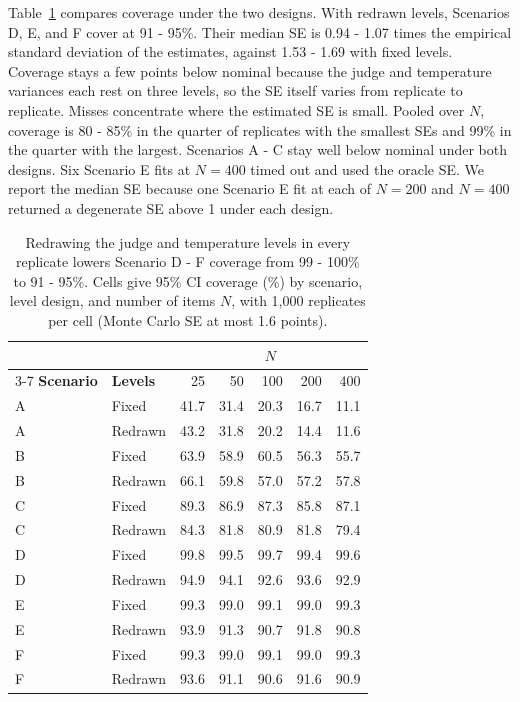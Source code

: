 Table~\ref{tab:underestimation_redraw} compares coverage under the two designs. With redrawn levels, Scenarios D, E, and F cover at 91 - 95\%. Their median SE is 0.94 - 1.07 times the empirical standard deviation of the estimates, against 1.53 - 1.69 with fixed levels. Coverage stays a few points below nominal because the judge and temperature variances each rest on three levels, so the SE itself varies from replicate to replicate. Misses concentrate where the estimated SE is small. Pooled over $N$, coverage is 80 - 85\% in the quarter of replicates with the smallest SEs and 99\% in the quarter with the largest. Scenarios A - C stay well below nominal under both designs. Six Scenario E fits at $N = 400$ timed out and used the oracle SE. We report the median SE because one Scenario E fit at each of $N = 200$ and $N = 400$ returned a degenerate SE above 1 under each design.

\begin{table}[h]
\centering
\small
\caption{Redrawing the judge and temperature levels in every replicate lowers Scenario D - F coverage from 99 - 100\% to 91 - 95\%. Cells give 95\% CI coverage (\%) by scenario, level design, and number of items $N$, with 1,000 replicates per cell (Monte Carlo SE at most 1.6 points).}
\label{tab:underestimation_redraw}
\begin{tabular}{llrrrrr}
\toprule
 & & \multicolumn{5}{c}{$N$} \\
\cmidrule(lr){3-7}
\textbf{Scenario} & \textbf{Levels} & 25 & 50 & 100 & 200 & 400 \\
\midrule
A & Fixed & 41.7 & 31.4 & 20.3 & 16.7 & 11.1 \\
A & Redrawn & 43.2 & 31.8 & 20.2 & 14.4 & 11.6 \\
\addlinespace
B & Fixed & 63.9 & 58.9 & 60.5 & 56.3 & 55.7 \\
B & Redrawn & 66.1 & 59.8 & 57.0 & 57.2 & 57.8 \\
\addlinespace
C & Fixed & 89.3 & 86.9 & 87.3 & 85.8 & 87.1 \\
C & Redrawn & 84.3 & 81.8 & 80.9 & 81.8 & 79.4 \\
\addlinespace
D & Fixed & 99.8 & 99.5 & 99.7 & 99.4 & 99.6 \\
D & Redrawn & 94.9 & 94.1 & 92.6 & 93.6 & 92.9 \\
\addlinespace
E & Fixed & 99.3 & 99.0 & 99.1 & 99.0 & 99.3 \\
E & Redrawn & 93.9 & 91.3 & 90.7 & 91.8 & 90.8 \\
\addlinespace
F & Fixed & 99.3 & 99.0 & 99.1 & 99.0 & 99.3 \\
F & Redrawn & 93.6 & 91.1 & 90.6 & 91.6 & 90.9 \\
\bottomrule
\end{tabular}
\end{table}


